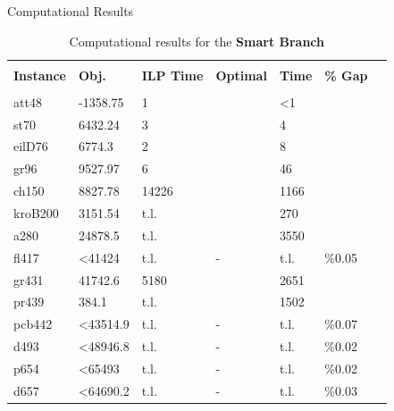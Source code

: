 \documentclass[10pt]{beamer}
\begin{document}
\begin{frame}[t]{Computational Results}
    \begin{table}
        \begin{center}
            \resizebox{.75\textwidth}{!}
            {
                \begin{tabular}{l l l l l l l}
                    \hline \\
                    \textbf{Instance}	&	\textbf{Obj.}	&	\textbf{ILP Time}	&	\textbf{Optimal}	&	\textbf{Time}	&	\textbf{\% Gap}	& \\
                    \hline \\
                    att48		&	-1358.75	&	1		&	\checkmark	&	<1		&			&	\\
                    st70		&	6432.24	    &	3		&	\checkmark	&	4		&			&	\\
                    eilD76		&	6774.3		&	2		&	\checkmark	&	8		&			&	\\
                    gr96		&	9527.97	    &	6		&	\checkmark	&	46		&			&	\\
                    ch150		&	8827.78	    &	14226	&	\checkmark	&	1166	&			&	\\
                    kroB200		&	3151.54	    &	t.l.	&	\checkmark	&	270		&			&	\\
                    a280		&	24878.5	    &	t.l.	&	\checkmark	&	3550	&			&	\\
                    fl417		&   <41424	    &	t.l.	&	-			&	t.l.	&	\%0.05	&	\\
                    gr431		&	41742.6	    &	5180	&	\checkmark	&	2651	&			&	\\
                    pr439		&	384.1	    &	t.l.	&	\checkmark	&	1502	&			&	\\
                    pcb442		&   <43514.9    &	t.l.	&	-			&	t.l.	&	\%0.07	&	\\
                    d493		&   <48946.8	&	t.l.	&	-			&	t.l.	&	\%0.02	&	\\
                    p654		&	<65493		&	t.l.	&	-			&	t.l.	&	\%0.02	&	\\
                    d657		&	<64690.2	&	t.l.	&	-			&	t.l.	&	\%0.03	&	\\
                    \hline
                \end{tabular} }
            \caption{Computational results for the \textbf{Smart Branch}} \label{tbl:results3}
        \end{center}
    \end{table}
\end{frame}
\end{document}
